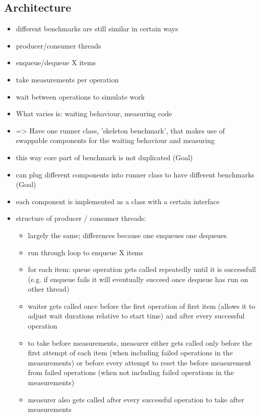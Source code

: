 \subsection{Architecture}
\begin{itemize}
    \item different benchmarks are still similar in certain ways
    \item producer/consumer threads
    \item enqueue/dequeue X items
    \item take measurements per operation
    \item wait between operations to simulate work
    \item What varies is: waiting behaviour, measuring code
    \item => Have one runner class, 'skeleton benchmark', that makes use of swappable components for the waiting behaviour and measuring
    \item this way core part of benchmark is not duplicated (Goal)
    \item can plug different components into runner class to have different benchmarks (Goal)
    \item each component is implemented as a class with a certain interface
    \item structure of producer / consumer threads:
        \begin{itemize}
            \item largely the same; differences because one enqueues one dequeues
            \item run through loop to enqueue X items
            \item for each item: queue operation gets called repeatedly until it is successfull (e.g. if enqueue fails it will eventually succeed once dequeue has run on other thread)
            \item waiter gets called once before the first operation of first item (allows it to adjust wait durations relative to start time) and after every successful operation
            \item to take before measurements, measurer either gets called only before the first attempt of each item (when including failed operations in the measurements)
                or before every attempt to reset the before measurement from failed operations (when not including failed operations in the measurements)
            \item measurer also gets called after every successful operation to take after measurements
        \end{itemize}
\end{itemize}

